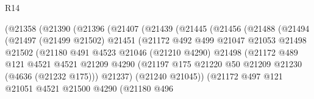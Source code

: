 \begin{lexlean}{R14}
\begin{coremodule}
                        (@21358
                          (@21390
                            (@21396
                              (@21407
                                (@21439
                                  (@21445
                                    (@21456
                                      (@21488
                                        (@21494
                                          (@21497
                                            (@21499 @21502)
                                            @21451
                                            (@21172
                                              @492
                                              @499
                                              @21047
                                              @21053
                                              @21498
                                              @21502
                                              (@21180
                                                @491
                                                @4523
                                                @21046
                                                (@21210 @4290)
                                                @21498
                                                (@21172
                                                  @489
                                                  @121
                                                  @4521
                                                  @4521
                                                  @21209
                                                  @4290
                                                  (@21197
                                                    @175
                                                    @21220
                                                    @50
                                                    @21209
                                                    @21230
                                                    (@4636 (@21232 @175)))
                                                  @21237)
                                                (@21240 @21045))
                                              (@21172
                                                @497
                                                @121
                                                @21051
                                                @4521
                                                @21500
                                                @4290
                                                (@21180
                                                  @496

\end{coremodule}
\end{lexlean}
